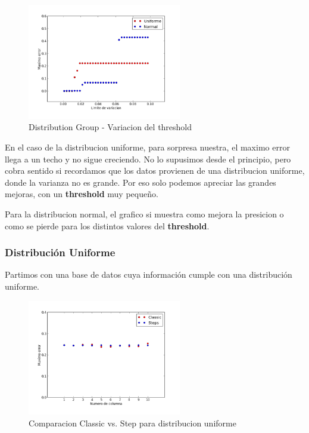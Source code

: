 \documentclass[10pt, a4paper,english,spanish,hidelinks]{article}
\begin{document}
\begin{figure}[h!]
  \centering
  \includegraphics[width=0.6\textwidth]{./imagenes/ejb2_group_parameter_variation.png}
  \caption{Distribution Group - Variacion del threshold}
\end{figure}


En el caso de la distribucion uniforme, para sorpresa nuestra, el maximo error llega a un
techo y no sigue creciendo. No lo supusimos desde el principio, pero cobra sentido si
recordamos que los datos provienen de una distribucion uniforme, donde la varianza no es
grande. Por eso solo podemos apreciar las grandes mejoras, con un \textbf{threshold} muy pequeño.

Para la distribucion normal, el grafico si muestra como mejora la presicion o como se pierde
para los distintos valores del \textbf{threshold}.









\subsubsection{Distribución Uniforme}

Partimos con una base de datos cuya información cumple con una distribución uniforme.

\begin{figure}[h!]
  \centering
  \includegraphics[width=0.6\textwidth]{./imagenes/ejb1_uniforme.png}
  \caption{Comparacion Classic vs. Step para distribucion uniforme}
\end{figure}
\end{document}
